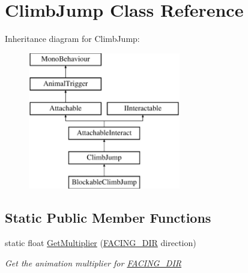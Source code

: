 \hypertarget{class_climb_jump}{}\section{Climb\+Jump Class Reference}
\label{class_climb_jump}
Inheritance diagram for Climb\+Jump\+:\begin{figure}[H]
\begin{center}
\leavevmode
\includegraphics[height=6.000000cm]{class_climb_jump}
\end{center}
\end{figure}
\subsection*{Static Public Member Functions}
\begin{DoxyCompactItemize}
\item 
static float \mbox{\hyperlink{class_climb_jump_a3a61d393fe89a5a9062af8d33e1881d7}{Get\+Multiplier}} (\mbox{\hyperlink{_animal_8cs_a57d10208ebba781ae206546ada2002b6}{F\+A\+C\+I\+N\+G\+\_\+\+D\+IR}} direction)
\begin{DoxyCompactList}\small\item\em Get the animation multiplier for \mbox{\hyperlink{_animal_8cs_a57d10208ebba781ae206546ada2002b6}{F\+A\+C\+I\+N\+G\+\_\+\+D\+IR}} \end{DoxyCompactList}\end{DoxyCompactItemize}
